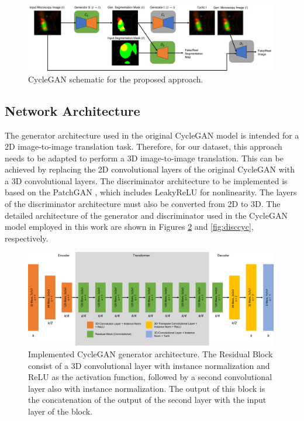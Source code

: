 \begin{figure}[!htb]
  \centering
  \includegraphics[width=0.99\textwidth]{Images/diagrama.jpg}
  \caption[CycleGAN schematic for the proposed approach.]{CycleGAN schematic for the proposed approach.}
  \label{fig:diagrama}
\end{figure}


\subsection*{Network Architecture}

The generator architecture used in the original CycleGAN model is intended for a 2D image-to-image translation task. Therefore, for our dataset, this approach needs to be adapted to perform a 3D image-to-image translation. This can be achieved by replacing the 2D convolutional layers of the original CycleGAN with a 3D convolutional layers.  The discriminator architecture to be implemented is based on the PatchGAN \cite{isola2018imagetoimage}, which includes LeakyReLU for nonlinearity. The layers of the discriminator architecture must also be converted from 2D to 3D. The detailed architecture of the generator and discriminator used in the CycleGAN model employed in this work are shown in Figures \ref{fig:gencyc} and \ref{fig:disccyc}, respectively.

\begin{figure}[!htb]
  \centering
  \includegraphics[width=0.99\textwidth]{Images/generator_cyclegan.jpg}
  \caption{Implemented CycleGAN generator architecture. The Residual Block consist of a \ac{3D} convolutional layer with instance normalization and ReLU as the activation function, followed by a second convolutional layer also with instance normalization.  The output of this block is the concatenation of the output of the second layer with the input layer of the block.}
  \label{fig:gencyc}
\end{figure}

